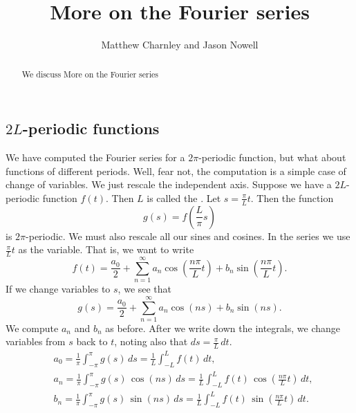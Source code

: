 \documentclass{ximera}
\title{More on the Fourier series}
\author{Matthew Charnley and Jason Nowell}
\begin{document}
\begin{abstract}
    We discuss More on the Fourier series
\end{abstract}
\maketitle


\label{moreonfourier:section}




\subsection{$2L$-periodic functions}

We have computed the Fourier series for a $2\pi$-periodic function, but what about functions of different periods.  Well, fear not, the computation is a simple case of change of variables.  We just rescale the independent axis.  Suppose we have a $2L$-periodic function $f(t)$.  Then $L$ is called the \emph{}.  Let $s = \frac{\pi}{L}  t$. Then the function
\begin{equation*}
    g(s) = f\left(\frac{L}{\pi} s \right)
\end{equation*}
is $2\pi$-periodic.  We must also rescale all our sines and cosines. In the series we use $\frac{\pi}{L} t$ as the variable.  That is, we want to write
\begin{equation*}
    f(t) =  \frac{a_0}{2} + \sum_{n=1}^\infty a_n \cos \left( \frac{n \pi}{L} t \right) + b_n \sin \left(\frac{n \pi}{L} t \right) .
\end{equation*}
If we change variables to $s$, we see that
\begin{equation*}
    g(s) =  \frac{a_0}{2} + \sum_{n=1}^\infty a_n \cos (n s) + b_n \sin (n s) .
\end{equation*}
We compute $a_n$ and $b_n$ as before.  After we write down the integrals, we change variables from $s$ back to $t$, noting also that $ds = \frac{\pi}{L} \, dt$.
\begin{equation*}
    \begin{aligned}
        & a_0 = \frac{1}{\pi} \int_{-\pi}^\pi g(s) \, ds 
        = \frac{1}{L} \int_{-L}^L f(t) \, dt , \\
        & a_n = \frac{1}{\pi} \int_{-\pi}^\pi g(s) \, \cos (n s) \, ds
        = \frac{1}{L} \int_{-L}^L f(t) \, \cos \left( \frac{n \pi}{L} t \right) \, dt , \\
        & b_n = \frac{1}{\pi} \int_{-\pi}^\pi g(s) \, \sin (n s) \, ds
        = \frac{1}{L} \int_{-L}^L f(t) \, \sin \left( \frac{n \pi}{L} t \right) \, dt .
    \end{aligned}
\end{equation*}
\end{document}
